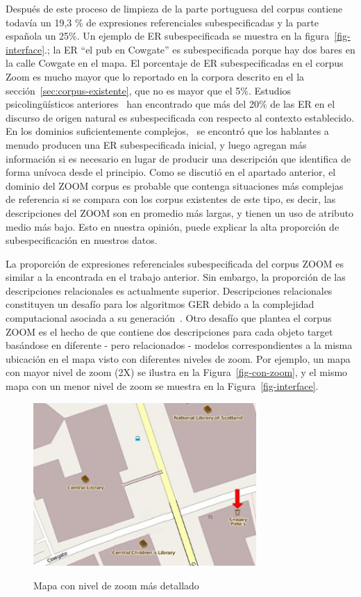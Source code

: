 Despu\'es de este proceso de limpieza de la parte portuguesa del corpus contiene todav\'{i}a un 19,3 \% de expresiones referenciales subespecificadas y la parte espa\~nola un 25\%. Un ejemplo de ER subespecificada se muestra en la figura~\ref{fig-interface}.; la ER ``el pub en Cowgate'' es subespecificada porque hay dos bares en la calle Cowgate en el mapa. El porcentaje de ER subespecificadas en el corpus Zoom es mucho mayor que lo reportado en la corpora descrito en el la secci\'on~\ref{sec:corpus-existente}, que no es mayor que el 5\%. Estudios psicoling\"u\'{i}sticos anteriores~\cite{Clark1986} han encontrado que m\'as del 20\% de las ER en el discurso de origen natural es subespecificada con respecto al contexto establecido. En los dominios suficientemente complejos,~\cite{Clark1986} se encontr\'o que los hablantes a menudo producen una ER subespecificada inicial, y luego agregan m\'as informaci\'on si es necesario en lugar de producir una descripci\'on que identifica de forma un\'{i}voca desde el principio. Como se discuti\'o en el apartado anterior, el dominio del ZOOM corpus es probable que contenga situaciones m\'as complejas de referencia si se compara con los corpus existentes de este tipo, es decir, las descripciones del ZOOM son en promedio m\'as largas, y tienen un uso de atributo medio m\'as bajo. Esto en nuestra opini\'on, puede explicar la alta proporci\'on de subespecificaci\'on en nuestros datos.

La proporci\'on de expresiones referenciales subespecificada del corpus ZOOM es similar a la encontrada en el trabajo anterior. Sin embargo, la proporci\'on de las descripciones relacionales es actualmente superior. Descripciones relacionales constituyen un desaf\'{i}o para los algoritmos GER debido a la complejidad computacional asociada a su generaci\'on~\cite{survey}. Otro desaf\'{i}o que plantea el corpus ZOOM es el hecho de que contiene dos descripciones para cada objeto target bas\'andose en diferente - pero relacionados - modelos correspondientes a la misma ubicaci\'on en el mapa visto con diferentes niveles de zoom. Por ejemplo, un mapa con mayor nivel de zoom (2X) se ilustra en la Figura~\ref{fig-con-zoom}, y el mismo mapa con un menor nivel de zoom se muestra en la Figura~\ref{fig-interface}.

\begin{figure}[ht]
\begin{center}
\includegraphics[width=8.5cm]{figures/with-zoom.jpg}\\[0pt]
\caption{Mapa con nivel de zoom m\'as detallado}
\label{fig-with-zoom}
\end{center}
\end{figure}

